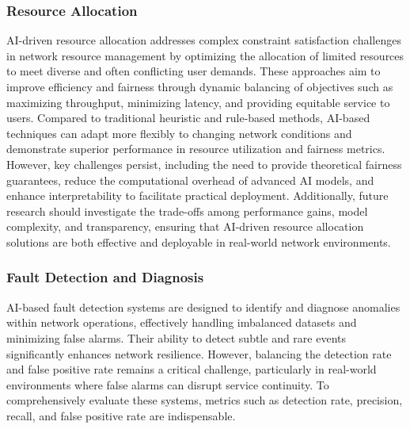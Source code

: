 \documentclass[sigconf]{acmart}
\begin{document}
\subsubsection{Resource Allocation}
AI-driven resource allocation addresses complex constraint satisfaction challenges in network resource management by optimizing the allocation of limited resources to meet diverse and often conflicting user demands. These approaches aim to improve efficiency and fairness through dynamic balancing of objectives such as maximizing throughput, minimizing latency, and providing equitable service to users. Compared to traditional heuristic and rule-based methods, AI-based techniques can adapt more flexibly to changing network conditions and demonstrate superior performance in resource utilization and fairness metrics. However, key challenges persist, including the need to provide theoretical fairness guarantees, reduce the computational overhead of advanced AI models, and enhance interpretability to facilitate practical deployment. Additionally, future research should investigate the trade-offs among performance gains, model complexity, and transparency, ensuring that AI-driven resource allocation solutions are both effective and deployable in real-world network environments.

\subsubsection{Fault Detection and Diagnosis}
AI-based fault detection systems are designed to identify and diagnose anomalies within network operations, effectively handling imbalanced datasets and minimizing false alarms. Their ability to detect subtle and rare events significantly enhances network resilience. However, balancing the detection rate and false positive rate remains a critical challenge, particularly in real-world environments where false alarms can disrupt service continuity. To comprehensively evaluate these systems, metrics such as detection rate, precision, recall, and false positive rate are indispensable.
\end{document}
